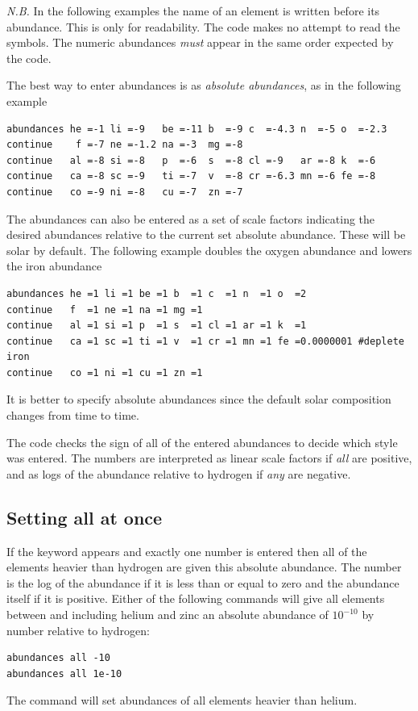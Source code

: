 \emph{N.B.}  In the following examples the name of an element is written
before its abundance.
This is only for readability.  The code makes no attempt
to read the symbols.
The numeric abundances \emph{must} appear in the same order
expected by the code.

The best way to enter abundances is as \emph{absolute abundances},
as in the following example
\begin{verbatim}
abundances he =-1 li =-9   be =-11 b  =-9 c  =-4.3 n  =-5 o  =-2.3
continue    f =-7 ne =-1.2 na =-3  mg =-8
continue   al =-8 si =-8   p  =-6  s  =-8 cl =-9   ar =-8 k  =-6
continue   ca =-8 sc =-9   ti =-7  v  =-8 cr =-6.3 mn =-6 fe =-8
continue   co =-9 ni =-8   cu =-7  zn =-7
\end{verbatim}
The abundances can also be entered as a set of scale factors indicating
the desired abundances relative to the current set absolute abundance.
These will be solar by default.
The following example doubles the oxygen
abundance and lowers the iron abundance
\begin{verbatim}
abundances he =1 li =1 be =1 b  =1 c  =1 n  =1 o  =2
continue   f  =1 ne =1 na =1 mg =1
continue   al =1 si =1 p  =1 s  =1 cl =1 ar =1 k  =1
continue   ca =1 sc =1 ti =1 v  =1 cr =1 mn =1 fe =0.0000001 #deplete iron
continue   co =1 ni =1 cu =1 zn =1
\end{verbatim}
It is better to specify absolute abundances since the default solar
composition changes from time to time.

The code checks the sign of all of the entered abundances to decide
which style was entered.
The numbers are interpreted as linear scale factors
if \emph{all} are positive,
and as logs of the abundance relative to hydrogen if
\emph{any} are negative.

\subsection{Setting all at once}

If the keyword  appears and exactly one number
is entered then all
of the elements heavier than hydrogen are given this absolute abundance.
The number is the log of the abundance if it is less than or equal to zero
and the abundance itself if it is positive.
Either of the following commands
will give all elements between and including helium and zinc an absolute
abundance of $10^{-10}$ by number relative to hydrogen:
\begin{verbatim}
abundances all -10
abundances all 1e-10
\end{verbatim}
The  command will set abundances
of all elements heavier than helium.

